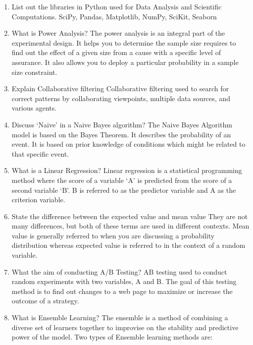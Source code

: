 \documentclass[
]{book}
\providecommand{\tightlist}{%
  \setlength{\itemsep}{0pt}\setlength{\parskip}{0pt}}
\begin{document}
\begin{enumerate}
\def\labelenumi{\arabic{enumi}.}
\setcounter{enumi}{8}
\tightlist
\item
  List out the libraries in Python used for Data Analysis and Scientific Computations.
  SciPy, Pandas, Matplotlib, NumPy, SciKit, Seaborn
\item
  What is Power Analysis?
  The power analysis is an integral part of the experimental design. It helps you to determine the sample size requires to find out the effect of a given size from a cause with a specific level of assurance. It also allows you to deploy a particular probability in a sample size constraint.
\item
  Explain Collaborative filtering
  Collaborative filtering used to search for correct patterns by collaborating viewpoints, multiple data sources, and various agents.
\item
  Discuss `Naive' in a Naive Bayes algorithm?
  The Naive Bayes Algorithm model is based on the Bayes Theorem. It describes the probability of an event. It is based on prior knowledge of conditions which might be related to that specific event.
\item
  What is a Linear Regression?
  Linear regression is a statistical programming method where the score of a variable `A' is predicted from the score of a second variable `B'. B is referred to as the predictor variable and A as the criterion variable.
\item
  State the difference between the expected value and mean value
  They are not many differences, but both of these terms are used in different contexts. Mean value is generally referred to when you are discussing a probability distribution whereas expected value is referred to in the context of a random variable.
\item
  What the aim of conducting A/B Testing?
  AB testing used to conduct random experiments with two variables, A and B. The goal of this testing method is to find out changes to a web page to maximize or increase the outcome of a strategy.
\item
  What is Ensemble Learning?
  The ensemble is a method of combining a diverse set of learners together to improvise on the stability and predictive power of the model. Two types of Ensemble learning methods are:
\end{enumerate}
\end{document}

